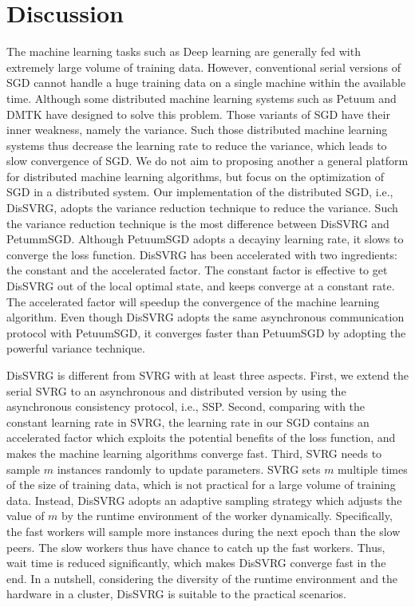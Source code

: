 \documentclass[10pt,journal,finalsubmission,compsoc]{IEEEtran}
\begin{document}
\section{Discussion}
\label{discussion}
The machine learning tasks such as Deep learning are generally fed with extremely large volume of training data. However, conventional serial versions of SGD  cannot handle a huge training data on a single machine within the available time. Although some distributed machine learning systems such as Petuum \cite{Xing:2015ib} and DMTK\cite{Yuan:2015ka} have designed to solve this problem.  Those variants of SGD have their inner weakness, namely the variance. Such those distributed machine learning systems thus decrease the learning rate to reduce the variance, which leads to slow convergence of SGD. We do not aim to proposing another a general platform for distributed machine learning algorithms, but focus on the optimization of SGD in a distributed system. Our implementation of the distributed SGD, i.e., DisSVRG, adopts the variance reduction technique to reduce the variance. Such the variance reduction technique is the most difference between DisSVRG and PetummSGD. Although PetuumSGD  adopts a decayiny learning rate, it slows to converge the loss function. DisSVRG has been accelerated with two ingredients: the constant and the accelerated factor. The constant factor is effective to get DisSVRG out of the local optimal state, and keeps converge at a constant rate. The accelerated factor will speedup the convergence of the machine learning algorithm. Even though DisSVRG adopts the same asynchronous communication protocol with PetuumSGD, it converges faster than PetuumSGD by adopting the powerful variance technique. 

DisSVRG is different from SVRG with at least three aspects. First, we extend the serial SVRG to an asynchronous and distributed version by using the asynchronous consistency protocol, i.e., SSP. Second, comparing with the constant learning rate in SVRG, the learning rate in our SGD contains an accelerated factor which exploits the potential benefits of the loss function, and makes the machine learning algorithms converge fast. Third, SVRG needs to sample $m$ instances randomly to update parameters. SVRG sets $m$ multiple times of the size of training data, which is not practical for a large volume of training data. Instead, DisSVRG adopts an adaptive sampling strategy which adjusts the value of $m$ by the runtime environment of the worker dynamically. Specifically, the fast workers will sample more instances during the next epoch than the slow peers. The slow workers thus have chance to catch up the fast workers. Thus, wait time is reduced significantly, which makes DisSVRG converge fast in the end. In a nutshell, considering the diversity of the runtime environment and the hardware in a cluster, DisSVRG is suitable to the practical scenarios. 
\end{document}
